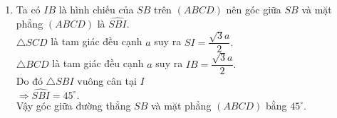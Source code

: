\begin{ex}
{\begin{enumerate}
			Suy ra $\bigtriangleup SAB$ vuông tại $B$.
			\item Ta có $IB$ là hình chiếu của $SB$ trên $(ABCD)$ nên góc giữa $SB$ và mặt phẳng $(ABCD)$ là $\widehat{SBI}.$\\
			$\bigtriangleup SCD$ là tam giác đều cạnh $a$ suy ra $SI=\dfrac{\sqrt{3}a}{2}.$\\
			$\triangle BCD$ là tam giác đều cạnh $a$ suy ra $IB=\dfrac{\sqrt{3}a}{2}.$\\
			Do đó $\triangle SBI$ vuông cân tại $I$\\ 
			$\Rightarrow \widehat{SBI}=45^{\circ}.$\\
			Vậy góc giữa đường thẳng $SB$ và mặt phẳng $(ABCD)$ bằng $45^{\circ}.$
		\end{enumerate}
	}
\end{ex}

